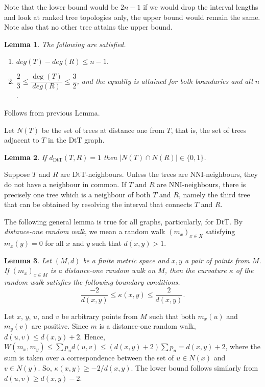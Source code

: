 \documentclass{amsart}
\newtheorem{lemma}{Lemma}
\newcommand{\dts}{\mathrm{DtT}}
\begin{document}
Note that the lower bound would be $2n-1$ if we would drop the interval lengths
and look at ranked tree topologies only, the upper bound would remain the same.
Note also that no other tree attains the upper bound. 

\begin{lemma}\label{degreeBounds}
The following are satisfied. 
\begin{enumerate}[(1)]
\item $deg(T)-deg(R) \leq n-1.$
\item $\dfrac23 \leq \dfrac{\deg(T)}{deg(R)} \leq \dfrac32$, and the equality is 
attained for both boundaries and all $n$. 
\end{enumerate}
\end{lemma}

\proof
Follows from previous Lemma. 
\endproof

Let $N(T)$ be the set of trees at distance one from $T$, that is, the set of
trees adjacent to $T$ in the $\dts$ graph. 

\begin{lemma}\label{intersecNeighb}
If $d_{\dts}(T,R) = 1$ then $|N(T)\cap N(R)|\in\{0,1\}$.
\end{lemma}

\proof
Suppose $T$ and $R$ are $\dts$-neighbours. Unless the trees are NNI-neighbours,
they do not have a neighbour in
common. If $T$ and $R$ are NNI-neighbours, there is precisely one tree which is
a neighbour of both $T$ and $R$, namely the third tree that can be obtained by
resolving the interval that connects $T$ and $R$. 
\endproof

The following general lemma is true for all graphs, particularly, for $\dts$. 
By {\em distance-one random walk}, we mean a random walk $(m_x)_{x \in X}$ 
satisfying $m_x(y) = 0$ for all $x$ and $y$ such that $d(x,y) > 1$. 

\begin{lemma}\label{curvBoundGeneral}
Let $(M,d)$ be a finite metric space and $x,y$ a pair of points from $M$. If
$(m_x)_{x \in M}$ is a distance-one random walk on $M$, then the curvature 
$\kappa$ of the random walk satisfies the following boundary conditions. 
\[
\dfrac{-2}{d(x,y)} \leq \kappa(x,y) \leq \dfrac{2}{d(x,y)}.
\]
\end{lemma}

\proof
Let $x$, $y$, $u$, and $v$ be arbitrary points from $M$ such that both $m_x(u)$
and $m_y(v)$ are positive. Since $m$ is a distance-one random walk, 
$d(u,v) \leq d(x,y) + 2$. Hence, 
$W(m_x,m_y) \leq \sum p_u d(u,v) \leq (d(x,y)+2)\sum p_u = d(x,y) + 2$, 
where the sum is taken over a correspondence between the set of $u \in N(x)$ and 
$v \in N(y)$. So, $\kappa(x,y) \geq - 2/d(x,y)$. The lower bound follows 
similarly from $d(u,v) \geq d(x,y) - 2$.
\endproof
\end{document}

